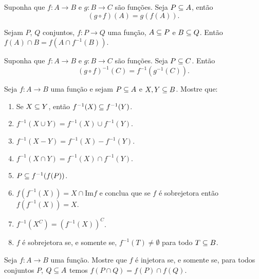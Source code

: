 \documentclass[12pt]{exam}
\begin{document}
    \vspace{.3cm}

    \questao{} Suponha que $f : A \to B$ e $g : B \to C$ são funções. Seja $P \subseteq A$, então
    \[
        (g \circ f)(A) = g(f(A)).
    \]

    \vspace{.3cm}

    \questao{} Sejam $P$, $Q$ conjuntos, $f : P \to Q$ uma função, $A \subseteq P$ e $B \subseteq Q$. Então $f(A) \cap B = f(A \cap f^{-1}(B))$.

    \vspace{.3cm}

    \questao{} Suponha que $f : A \to B$ e $g : B \to C$ são funções. Seja $P \subseteq C$. Então
    \[
        (g \circ f)^{-1}(C) = f^{-1}(g^{-1}(C)).
    \]

    \questao{} Seja $f : A \to B$ uma fun{\c c}{\~a}o e sejam $P \subseteq
    A$ e $X, Y\subseteq B$. Mostre que:
    \begin{enumerate}[label={\alph*})]
        \item Se $X\subseteq Y$, ent{\~a}o $f^{-1}(X)\subseteq f^{-1}(Y)$.

        \item $f^{-1}(X\cup Y)=f^{-1}(X)\cup f^{-1}(Y)$.

        \item $f^{-1}(X - Y) = f^{-1}(X) - f^{-1}(Y)$.

        \item $f^{-1}(X\cap Y)= f^{-1}(X)\cap f^{-1}(Y)$.

        \item $P\subseteq f^{-1}(f(P))$.

        \item $f(f^{-1}(X))= X \cap \mbox{Im}f$ e conclua que se $f$ {\'e} sobrejetora ent{\~a}o
        $f(f^{-1}(X))=X$.
        \item $f^{-1}(X^C) = (f^{-1}(X))^C$.

        \item $f$ \'e sobrejetora se, e somente se, $f^{-1}(T) \ne \emptyset$ para todo $T \subseteq B$.
    \end{enumerate}

    \vspace{.3cm}

    \questao{} Seja $f : A \to B$ uma função. Mostre que $f$ é injetora se, e somente se, para todos conjuntos $P$, $Q \subseteq A$ temos $f(P \cap Q) = f(P) \cap f(Q)$.

    \vspace{.3cm}
\end{document}
